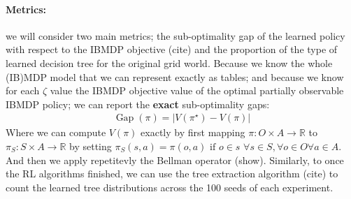 \paragraph{Metrics:} we will consider two main metrics; the sub-optimality gap of the learned policy with respect to the IBMDP objective (cite) and the proportion of the type of learned decision tree for the original grid world.
Because we know the whole (IB)MDP model that we can represent exactly as tables; and because we know for each $\zeta$ value the IBMDP objective value of the optimal partially observable IBMDP policy; we can report the \textbf{exact} sub-optimality gaps:
\begin{align*}
    \operatorname{Gap}(\pi) = |V(\pi^{\star}) - V(\pi)|
\end{align*}
Where we can compute $V(\pi)$ exactly by first mapping $\pi : O \times A \rightarrow \mathbb{R}$ to $\pi_{S} : S \times A \rightarrow \mathbb{R}$ by setting $\pi_S (s, a) = \pi(o,a) \text{ if }o\in s$ $\forall s \in S, \forall o \in O \forall a \in A$.
And then we apply repetitevly the Bellman operator (show).
Similarly, to once the RL algorithms finished, we can use the tree extraction algorithm (cite) to count the learned tree distributions across the 100 seeds of each experiment.

